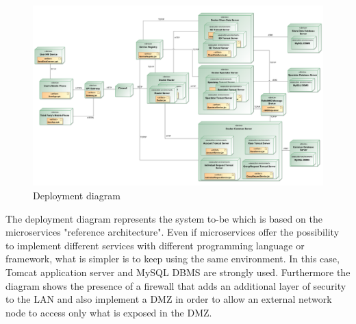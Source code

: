 \begin{figure}[H]
\includegraphics[width=\linewidth]{Images/deploymentdiagram.pdf}
\caption{ Deployment diagram }
\label{fig:deployment}
\end{figure}

The deployment diagram represents the system to-be which is based on the microservices "reference architecture". Even if 
microservices offer the possibility to implement different services with different programming language or framework, what is simpler 
is to keep using the same environment. In this case, Tomcat application server and MySQL DBMS are strongly used. Furthermore the diagram shows the presence of a firewall that adds an additional layer of security to the LAN and also implement a DMZ in order to allow an external network node to access only what is exposed in the DMZ.